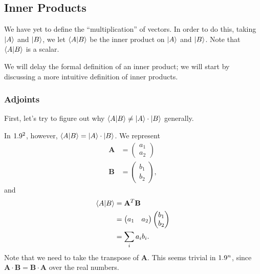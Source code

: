 \documentclass[10pt]{mypackage}
\begin{document}
\subsection{Inner Products}%
We have yet to define the ``multiplication'' of vectors. In order to do this, taking $ \ket{A} $ and $ \ket{B} $, we let $ \braket{A}{B} $ be the inner product on $ \ket{A} $ and $ \ket{B} $. Note that $ \braket{A}{B} $ is a scalar.\newline

We will delay the formal definition of an inner product; we will start by discussing a more intuitive definition of inner products.
\subsubsection{Adjoints}
First, let's try to figure out why $ \braket{A}{B}  \neq \ket{A}\cdot \ket{B}$ generally.\newline

In $1.9^2$, however, $ \braket{A}{B} = \ket{A}\cdot \ket{B} $. We represent
\begin{align*}
  \mathbf{A} &= \begin{pmatrix}a_1\\a_2\end{pmatrix}\\
  \mathbf{B} &= \begin{pmatrix}b_1\\b_2\end{pmatrix},
\end{align*}
and
\begin{align*}
  \braket{A}{B} &= \mathbf{A}^{T}\mathbf{B}\\
    &= \begin{pmatrix}a_1 & a_2\end{pmatrix} \begin{pmatrix}b_1\\b_2\end{pmatrix}\\
                             &= \sum_{i} a_ib_i.
\end{align*}
Note that we need to take the transpose of $\mathbf{A}$. This seems trivial in $1.9^n$, since $\mathbf{A}\cdot \mathbf{B} = \mathbf{B}\cdot \mathbf{A}$ over the real numbers.\newline
\end{document}
